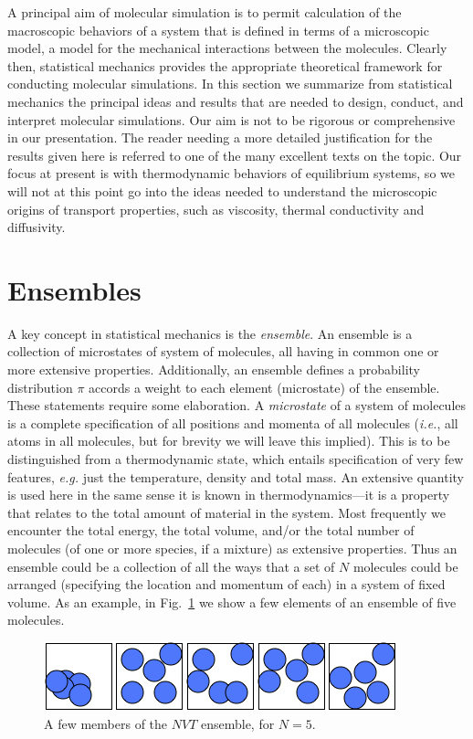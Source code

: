 \documentclass[9pt,bestpractices]{molsim}
\begin{document}
A principal aim of molecular simulation is to permit calculation of the
macroscopic behaviors of a system that is defined in terms of a
microscopic model, a model for the mechanical interactions between the
molecules. Clearly then, statistical mechanics provides the appropriate
theoretical framework for conducting molecular simulations. In this
section we summarize from statistical mechanics the principal ideas and
results that are needed to design, conduct, and interpret molecular
simulations. Our aim is not to be rigorous or comprehensive in our
presentation. The reader needing a more detailed justification for the
results given here is referred to one of the many excellent texts on the
topic. Our focus at present is with thermodynamic behaviors of
equilibrium systems, so we will not at this point go into the ideas
needed to understand the microscopic origins of transport properties,
such as viscosity, thermal conductivity and diffusivity.

\section{Ensembles}\label{ensembles}

A key concept in statistical mechanics is the \emph{ensemble}. An
ensemble is a collection of microstates of system of molecules, all
having in common one or more extensive properties. Additionally, an
ensemble defines a probability distribution $\pi$ accords a weight to each
element (microstate) of the ensemble. These statements require some
elaboration. A \emph{microstate} of a system of molecules is a complete
specification of all positions and momenta of all molecules
(\emph{i.e.}, all atoms in all molecules, but for brevity we will leave
this implied). This is to be distinguished from a thermodynamic state,
which entails specification of very few features, \emph{e.g.} just the
temperature, density and total mass. An extensive quantity is used here
in the same sense it is known in thermodynamics---it is a property that
relates to the total amount of material in the system. Most frequently
we encounter the total energy, the total volume, and/or the total number
of molecules (of one or more species, if a mixture) as extensive
properties. Thus an ensemble could be a collection of all the ways that
a set of $N$ molecules could be arranged (specifying the location
and momentum of each) in a system of fixed volume. As an example, in
Fig.~\ref{fig:NVT} we show a few elements of an ensemble of five molecules.
\begin{figure}
\includegraphics[width=\textwidth]{StatMech_figures/image001}
\caption{\label{fig:NVT}A few members of the $NVT$ ensemble, for $N = 5$.}
\end{figure}
\end{document}
